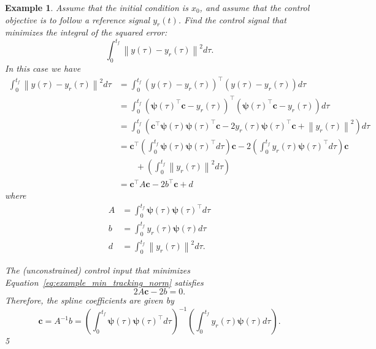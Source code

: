 \documentclass{article}
\newtheorem{example}[theorem]{Example}
\newcommand{\norm}[1]{\left\|{#1}\right\|}
\newcommand{\cbf}{\mathbf{c}}
\begin{document}
\begin{example}
	Assume that the initial condition is $x_0$, and assume that the control objective is to follow a reference signal $y_r(t)$.    
	Find the control signal that minimizes the integral of the squared error:
	\begin{equation} \label{eq:example_min_tracking_norm}
	\int_0^{t_f} \norm{y(\tau) - y_r(\tau)}^2 d\tau.
	\end{equation}
	In this case we have
	\begin{align*}
			\int_0^{t_f} \norm{y(\tau) - y_r(\tau)}^2 d\tau 
				&= \int_0^{t_f} (y(\tau) - y_r(\tau))^\top (y(\tau)-y_r(\tau)) d\tau \\
				&= \int_0^{t_f} (\boldsymbol{\psi}(\tau)^\top \cbf  - y_r(\tau))^\top (\boldsymbol{\psi}(\tau)^\top \cbf-y_r(\tau)) d\tau \\
				&= \int_0^{t_f} \left(\cbf^\top \boldsymbol{\psi}(\tau) \boldsymbol{\psi}(\tau)^\top \cbf
					 - 2 y_r(\tau) \boldsymbol{\psi}(\tau)^\top \cbf + \norm{y_r(\tau)}^2 \right) d\tau \\
				&= \cbf^\top \left(\int_0^{t_f} \boldsymbol{\psi}(\tau) \boldsymbol{\psi}(\tau)^\top d\tau \right) \cbf
					 - 2 \left(\int_0^{t_f} y_r(\tau) \boldsymbol{\psi}(\tau)^\top d\tau\right) \cbf 
					 \\ &\qquad
					 + \left(\int_0^{t_f}\norm{y_r(\tau)}^2  d\tau \right) \\
				&= \cbf^\top A \cbf - 2 b^\top \cbf + d
	\end{align*}
	where
	\begin{align*}
		A &= \int_0^{t_f} \boldsymbol{\psi}(\tau) \boldsymbol{\psi}(\tau)^\top d\tau \\
		b &= \int_0^{t_f} y_r(\tau) \boldsymbol{\psi}(\tau) d\tau \\
		d &= \int_0^{t_f}\norm{y_r(\tau)}^2  d\tau.
	\end{align*}
	
	The (unconstrained) control input that minimizes Equation~\eqref{eq:example_min_tracking_norm} satisfies
	\[
	2 A \cbf - 2 b = 0.
	\]
	Therefore, the spline coefficients are given by
	\[
	\cbf = A^{-1}b = \left(\int_0^{t_f} \boldsymbol{\psi}(\tau) \boldsymbol{\psi}(\tau)^\top d\tau \right)^{-1} \left(\int_0^{t_f} y_r(\tau) \boldsymbol{\psi}(\tau) d\tau \right).
	\]5
\end{example}






\end{document}
